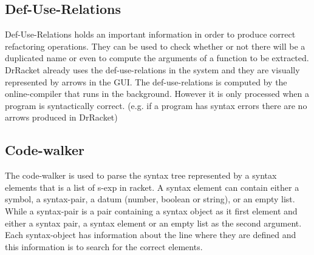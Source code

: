 


\subsection{Def-Use-Relations}
Def-Use-Relations holds an important information in order to produce correct refactoring operations. %
They can be used to check whether or not there will be a duplicated name
or even to compute the arguments of a function to be extracted.
DrRacket already uses the def-use-relations in the system and they are visually  %
represented by arrows in the GUI.
The def-use-relations is computed by the online-compiler that runs in the background.
However it is only processed when a program is syntactically correct. (e.g. if
a program has syntax errors there are no arrows produced in DrRacket)

\subsection{Code-walker}
The code-walker is used to parse the syntax tree represented by a syntax elements
that is a list of s-exp in racket. %
A syntax element can contain either a symbol, a syntax-pair, a datum (number, boolean or string),
or an empty list. %
While a syntax-pair is a pair containing a syntax object as it first element and
either a syntax pair, a syntax element or an empty list as the second argument.
Each syntax-object has information about the line where they are defined and this
information is to search for the correct elements.

